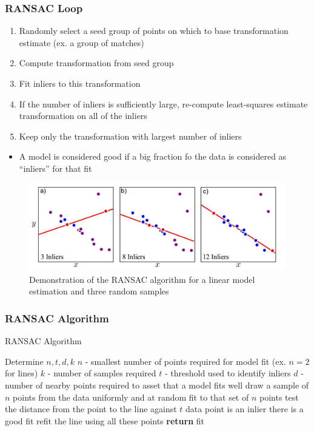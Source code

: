 \documentclass[letterpaper,12pt]{article}
\begin{document}
\subsubsection{RANSAC Loop}
\begin{enumerate}
 \item Randomly select a seed group of points on which to base transformation estimate (ex. a group of matches)
 \item Compute transformation from seed group
 \item Fit inliers to this transformation
 \item If the number of inliers is sufficiently large, re-compute least-squares estimate  transformation on all of the inliers
 \item Keep only the transformation with largest number of inliers
\end{enumerate}
\begin{itemize}
 \item A model is considered good if a big fraction fo the data is considered as ``inliers'' for that fit
\end{itemize}
\begin{figure}[H]
 \centering
 \includegraphics[width=\textwidth]{images/ransac_linear_fit.png}
 \caption{Demonstration of the RANSAC algorithm for a linear model estimation and three random samples}
\end{figure}

\subsubsection{RANSAC Algorithm}
\begin{algorithm}
 \caption{RANSAC Algorithm}
 \begin{algorithmic}[1]
  \State Determine $n, t, d, k$
  \State \quad $n$ - smallest number of points required for model fit (ex. $n=2$ for lines)
  \State \quad $k$ - number of samples required
  \State \quad $t$ - threshold used to identify inliers
  \State \quad $d$ - number of nearby points required to asset that a model fits well
  \Repeat
  \State draw a sample of $n$ points from the data uniformly and at random
  \State fit to that set of $n$ points
  \State test the distance from the point to the line against $t$
  \State data point is an inlier
  \EndIf
  \EndFor
  \State there is a good fit
  \State refit the line using all these points
  \State \textbf{return} fit
  \EndIf
 \end{algorithmic}
\end{algorithm}
\end{document}

